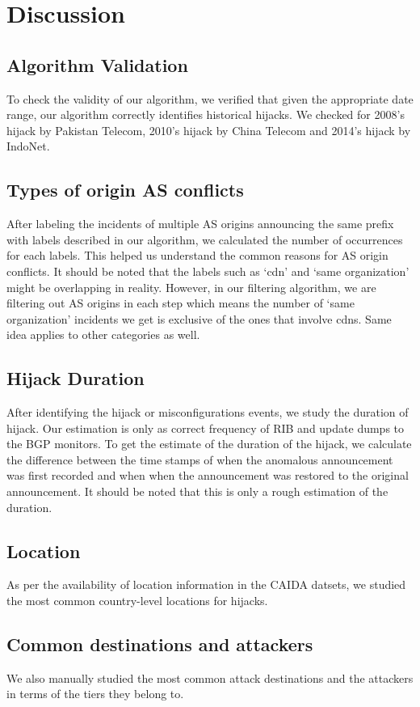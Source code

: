  \section{Discussion}\label{sec:discussion}
\subsection{Algorithm Validation}
To check the validity of our algorithm, we verified that given the appropriate date range, our algorithm correctly identifies historical hijacks. We checked for 2008's hijack by Pakistan Telecom, 2010's hijack by China Telecom and 2014's hijack by IndoNet. 
\subsection{Types of origin AS conflicts}
After labeling the incidents of multiple AS origins announcing the same prefix with labels described in our algorithm, we calculated the number of occurrences for each labels. This helped us understand the common reasons for AS origin conflicts. It should be noted that the labels such as `cdn' and `same organization' might be overlapping in reality. However, in our filtering algorithm, we are filtering out AS origins in each step which means the number of `same organization' incidents we get is exclusive of the ones that involve cdns. Same idea applies to other categories as well.
\subsection{Hijack Duration}
After identifying the hijack or misconfigurations events, we study the duration of hijack. Our estimation is only as correct frequency of RIB and update dumps to the BGP monitors. To get the estimate of the duration of the hijack, we calculate the difference between the time stamps of when the anomalous announcement was first recorded and when when the announcement was restored to the original announcement. It should be noted that this is only a rough estimation of the duration. 
\subsection{Location}
As per the availability of location information in the CAIDA datsets, we studied the most common country-level locations for hijacks. 
\subsection{Common destinations and attackers}
We also manually studied the most common attack destinations and the attackers in terms of the tiers they belong to. 
